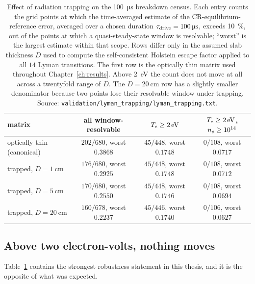 \begin{table}[tbp]
  \centering
  \caption[Breakdown census under Lyman trapping]{Effect of radiation
  trapping on the \SI{100}{\micro\second} breakdown census. Each entry counts the grid points at
  which the time-averaged estimate of the CR-equilibrium-reference error,
  averaged over a chosen duration $\tau_{\mathrm{drive}} = \SI{100}{\micro\second}$, exceeds
  \SI{10}{\percent}, out of the points at which a
  quasi-steady-state window is resolvable; ``worst'' is the largest estimate
  within that scope. Rows differ only in the assumed slab thickness $D$ used to
  compute the self-consistent Holstein escape factor applied to all $14$ Lyman
  transitions. The first row is the optically thin matrix used throughout
  Chapter~\ref{ch:results}. Above \SI{2}{\electronvolt} the count does not move
  at all across a twentyfold range of $D$. The $D = \SI{20}{\centi\metre}$ row
  has a slightly smaller denominator because two points lose their resolvable
  window under trapping. Source:
  \texttt{validation/lyman\_trapping/lyman\_trapping.txt}.}
  \label{tab:trapping_census}
  \footnotesize
  \begin{tabular}{lccc}
    \toprule
    matrix & all window-resolvable & $T_e \ge \SI{2}{\electronvolt}$ &
          $T_e \ge \SI{2}{\electronvolt}$, $n_e \ge 10^{14}$ \\
    \midrule
    optically thin (canonical)          & $202/680$, worst $0.3868$ & $45/448$, worst $0.1748$ & $0/108$, worst $0.0717$ \\
    trapped, $D = \SI{1}{\centi\metre}$  & $176/680$, worst $0.2925$ & $45/448$, worst $0.1748$ & $0/108$, worst $0.0712$ \\
    trapped, $D = \SI{5}{\centi\metre}$  & $170/680$, worst $0.2550$ & $45/448$, worst $0.1746$ & $0/108$, worst $0.0694$ \\
    trapped, $D = \SI{20}{\centi\metre}$ & $160/678$, worst $0.2237$ & $45/446$, worst $0.1740$ & $0/106$, worst $0.0627$ \\
    \bottomrule
  \end{tabular}
\end{table}

\subsection{Above two electron-volts, nothing moves}

Table~\ref{tab:trapping_census} contains the strongest robustness statement in
this thesis, and it is the opposite of what was expected.

